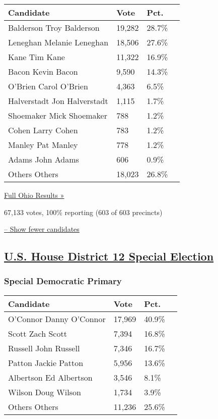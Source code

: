 \begin{longtable}[]{@{}llll@{}}
\toprule
Candidate & Vote & Pct. &\tabularnewline
\midrule
\endhead
 Balderson Troy Balderson & 19,282 & 28.7\% &\tabularnewline
 Leneghan Melanie Leneghan & 18,506 & 27.6\% &\tabularnewline
 Kane Tim Kane & 11,322 & 16.9\% &\tabularnewline
 Bacon Kevin Bacon & 9,590 & 14.3\% &\tabularnewline
 O'Brien Carol O'Brien & 4,363 & 6.5\% &\tabularnewline
 Halverstadt Jon Halverstadt & 1,115 & 1.7\% &\tabularnewline
 Shoemaker Mick Shoemaker & 788 & 1.2\% &\tabularnewline
 Cohen Larry Cohen & 783 & 1.2\% &\tabularnewline
 Manley Pat Manley & 778 & 1.2\% &\tabularnewline
 Adams John Adams & 606 & 0.9\% &\tabularnewline
 Others Others & 18,023 & 26.8\% &\tabularnewline
\bottomrule
\end{longtable}

\href{https://www.nytimes3xbfgragh.onion/elections/results/ohio}{Full
Ohio Results »}

67,133 votes, 100\% reporting (603 of 603 precincts)

\protect\hyperlink{}{-- Show fewer candidates}

\hypertarget{us-house-district-12-special-election}{%
\subsection{\texorpdfstring{\href{https://www.nytimes3xbfgragh.onion/elections/results/ohio-house-district-12-primary-election}{U.S.
House District 12 Special
Election}}{U.S. House District 12 Special Election}}\label{us-house-district-12-special-election}}

\hypertarget{special-democratic-primary}{%
\subsubsection{Special Democratic
Primary}\label{special-democratic-primary}}

\begin{longtable}[]{@{}llll@{}}
\toprule
Candidate & Vote & Pct. &\tabularnewline
\midrule
\endhead
 O'Connor Danny O'Connor & 17,969 & 40.9\% &\tabularnewline
 Scott Zach Scott & 7,394 & 16.8\% &\tabularnewline
 Russell John Russell & 7,346 & 16.7\% &\tabularnewline
 Patton Jackie Patton & 5,956 & 13.6\% &\tabularnewline
 Albertson Ed Albertson & 3,546 & 8.1\% &\tabularnewline
 Wilson Doug Wilson & 1,734 & 3.9\% &\tabularnewline
 Others Others & 11,236 & 25.6\% &\tabularnewline
\bottomrule
\end{longtable}

